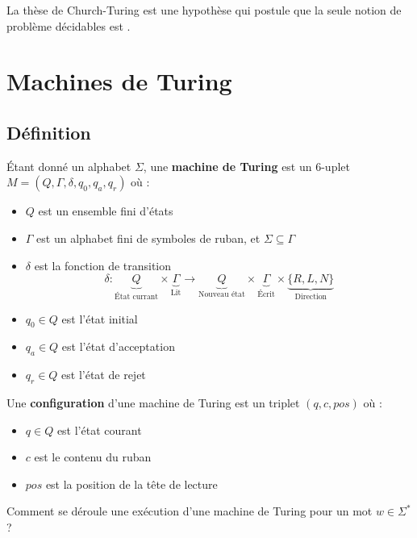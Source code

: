 \documentclass{article}
\begin{document}
La thèse de Church-Turing est une hypothèse qui postule que la seule notion de problème décidables est .

\section{Machines de Turing}

\subsection{Définition}

\begin{definition}
	Étant donné un alphabet $\Sigma$, une \textbf{machine de Turing} est un 6-uplet $M = (Q, \Gamma, \delta, q_0, q_a, q_r)$ où :
	\begin{itemize}
		\item $Q$ est un ensemble fini d'états
		\item $\Gamma$ est un alphabet fini de symboles de ruban, et $\Sigma \subseteq \Gamma$
		\item $\delta$ est la fonction de transition
		      $$ \delta: \underbrace{Q}_{\text{État currant}} \times \underbrace{\Gamma}_{\text{Lit}} \to \underbrace{Q}_{\text{Nouveau état}} \times
			      \underbrace{\Gamma}_{\text{Écrit}} \times \underbrace{\{R, L, N\}}_{\text{Direction}} $$
		\item $q_0 \in Q$ est l'état initial
		\item $q_a \in Q$ est l'état d'acceptation
		\item $q_r \in Q$ est l'état de rejet
	\end{itemize}
\end{definition}

\begin{definition}[Configuration]
	Une \textbf{configuration} d'une machine de Turing est un triplet $(q, c, pos)$ où :
	\begin{itemize}
		\item $q \in Q$ est l'état courant
		\item $c$ est le contenu du ruban
		\item $pos$ est la position de la tête de lecture
	\end{itemize}
\end{definition}

Comment se déroule une exécution d'une machine de Turing pour un mot $w \in \Sigma^*$ ?
\end{document}
